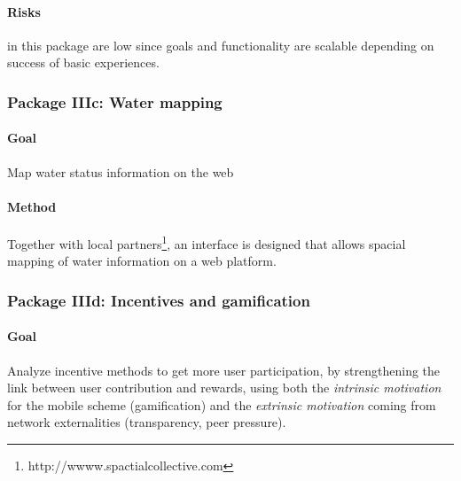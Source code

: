 \documentclass[11pt]{article}
\newcommand{\simon}[1]{\vspace{1em}(\emph{Simon: #1})\vspace{1em}}
\begin{document}
\paragraph{Risks} in this package are low since goals and functionality are scalable depending on success of basic experiences.


\subsubsection*{Package IIIc: Water mapping}
\paragraph{Goal} Map water status information on the web
\paragraph{Method} Together with local partners\footnote{http://wwww.spactialcollective.com}, an interface is designed that allows spacial mapping of water information on a web platform.

% 


\subsubsection*{Package IIId: Incentives and gamification}
\paragraph{Goal} Analyze incentive methods to get more user participation, by strengthening the link between user contribution and rewards, using both the \emph{intrinsic motivation} for the mobile scheme (gamification) and the \emph{extrinsic motivation} coming from network externalities (transparency, peer pressure).
\end{document}
